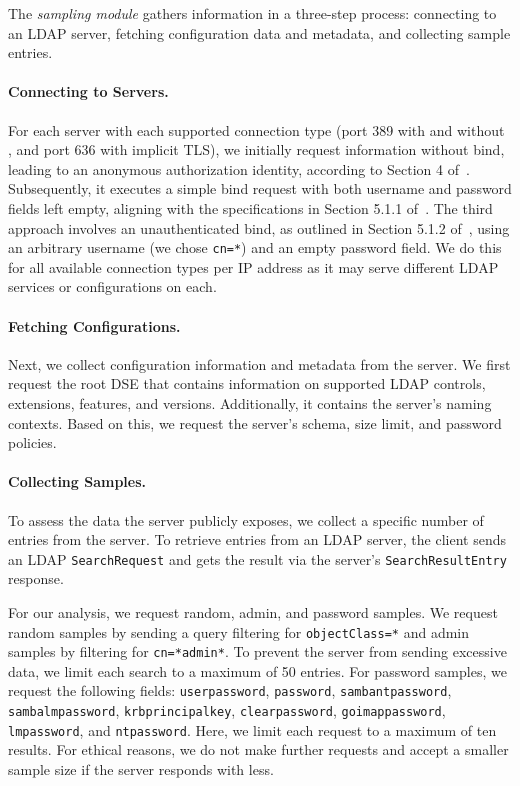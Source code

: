 The \emph{sampling module} gathers information in a three-step process: connecting to an LDAP server, fetching configuration data and metadata, and collecting sample entries.

\paragraph{Connecting to Servers.} For each server with each supported connection type (port 389 with and without \starttls, and port 636 with implicit TLS), we initially request information without bind, leading to an anonymous authorization identity, according to Section 4 of~\cite{rfc4513}. Subsequently, it executes a simple bind request with both username and password fields left empty, aligning with the specifications in Section 5.1.1 of~\cite{rfc4513}. The third approach involves an unauthenticated bind, as outlined in Section 5.1.2 of~\cite{rfc4513}, using an arbitrary username (we chose \texttt{cn=*}) and an empty password field. We do this for all available connection types per IP address as it may serve different \gls{LDAP} services or configurations on each. 

\paragraph{Fetching Configurations.} Next, we collect configuration information and metadata from the server. We first request the root \gls{DSE} that contains information on supported \gls{LDAP} controls, extensions, features, and versions. Additionally, it contains the server's naming contexts. Based on this, we request the server's schema, size limit, and password policies. 


\paragraph{Collecting Samples.} To assess the data the server publicly exposes, we collect a specific number of entries from the server. To retrieve entries from an \gls{LDAP} server, the client sends an \gls{LDAP} \texttt{SearchRequest} and gets the result via the server's \texttt{SearchResultEntry} response.

For our analysis, we request random, admin, and password samples. We request random samples by sending a query filtering for \texttt{objectClass=*} and admin samples by filtering for \texttt{cn=*admin*}. To prevent the server from sending excessive data, we limit each search to a maximum of 50 entries. For password samples, we request the following fields: \texttt{userpassword}, \texttt{password}, \texttt{sambantpassword}, \texttt{sambalmpassword}, \texttt{krbprincipalkey}, \texttt{clearpassword}, \texttt{goimappassword}, \texttt{lmpassword}, and \texttt{ntpassword}.
Here, we limit each request to a maximum of ten results. For ethical reasons, we do not make further requests and accept a smaller sample size if the server responds with less.

